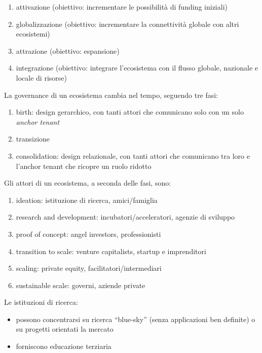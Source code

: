 \documentclass[answers, a4paper, 11pt]{exam}
\begin{document}
\begin{enumerate}
    \item attivazione (obiettivo: incrementare le possibilità di funding iniziali)
    \item globalizzazione (obiettivo: incrementare la connettività globale con altri ecosistemi)
    \item attrazione (obiettivo: espansione)
    \item integrazione (obiettivo: integrare l'ecosistema con il flusso globale, nazionale e locale di risorse)
\end{enumerate}

La governance di un ecosistema cambia nel tempo, seguendo tre fasi:

\begin{enumerate}
    \item birth: design gerarchico, con tanti attori che comunicano solo con un solo \emph{anchor tenant}
    \item transizione
    \item consolidation: design relazionale, con tanti attori che comunicano tra loro e l'anchor tenant che ricopre un ruolo ridotto
\end{enumerate}

Gli attori di un ecosistema, a seconda delle fasi, sono:

\begin{enumerate}
    \item ideation: istituzione di ricerca, amici/famiglia
    \item research and development: incubatori/acceleratori, agenzie di sviluppo
    \item proof of concept: angel investors, professionisti
    \item transition to scale: venture capitalists, startup e imprenditori
    \item scaling: private equity, facilitatori/intermediari
    \item sustainable scale: governi, aziende private
\end{enumerate}

Le istituzioni di ricerca:

\begin{itemize}
    \item possono concentrarsi su ricerca ``blue-sky'' (senza applicazioni ben definite) o su progetti orientati la mercato
    \item forniscono educazione terziaria
\end{itemize}
\end{document}
